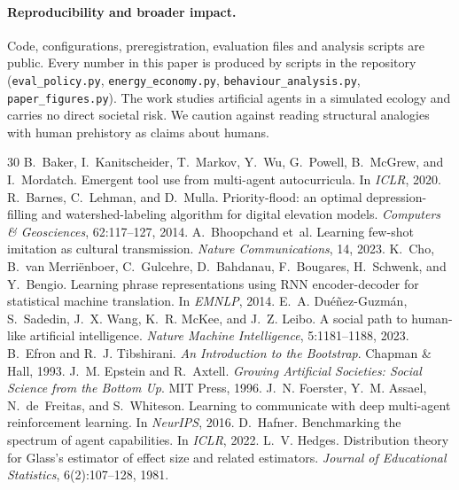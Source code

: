 \documentclass[10pt]{article}
\begin{document}
\paragraph{Reproducibility and broader impact.} Code, configurations, preregistration, evaluation files and analysis
scripts are public. Every number in this paper is produced by scripts in the repository (\texttt{eval\_policy.py},
\texttt{energy\_economy.py}, \texttt{behaviour\_analysis.py}, \texttt{paper\_figures.py}). The work studies artificial
agents in a simulated ecology and carries no direct societal risk. We caution against reading structural analogies with
human prehistory as claims about humans.

\begin{thebibliography}{30}\small
{} B.~Baker, I.~Kanitscheider, T.~Markov, Y.~Wu, G.~Powell, B.~McGrew, and I.~Mordatch. Emergent tool use from multi-agent autocurricula. In \emph{ICLR}, 2020.
 R.~Barnes, C.~Lehman, and D.~Mulla. Priority-flood: an optimal depression-filling and watershed-labeling algorithm for digital elevation models. \emph{Computers \& Geosciences}, 62:117--127, 2014.
 A.~Bhoopchand et~al. Learning few-shot imitation as cultural transmission. \emph{Nature Communications}, 14, 2023.
 K.~Cho, B.~van Merri\"enboer, C.~Gulcehre, D.~Bahdanau, F.~Bougares, H.~Schwenk, and Y.~Bengio. Learning phrase representations using RNN encoder-decoder for statistical machine translation. In \emph{EMNLP}, 2014.
 E.~A. Du\'e\~nez-Guzm\'an, S.~Sadedin, J.~X. Wang, K.~R. McKee, and J.~Z. Leibo. A social path to human-like artificial intelligence. \emph{Nature Machine Intelligence}, 5:1181--1188, 2023.
 B.~Efron and R.~J. Tibshirani. \emph{An Introduction to the Bootstrap}. Chapman \& Hall, 1993.
 J.~M. Epstein and R.~Axtell. \emph{Growing Artificial Societies: Social Science from the Bottom Up}. MIT Press, 1996.
 J.~N. Foerster, Y.~M. Assael, N.~de~Freitas, and S.~Whiteson. Learning to communicate with deep multi-agent reinforcement learning. In \emph{NeurIPS}, 2016.
 D.~Hafner. Benchmarking the spectrum of agent capabilities. In \emph{ICLR}, 2022.
 L.~V. Hedges. Distribution theory for Glass's estimator of effect size and related estimators. \emph{Journal of Educational Statistics}, 6(2):107--128, 1981.

\end{thebibliography}
\end{document}
